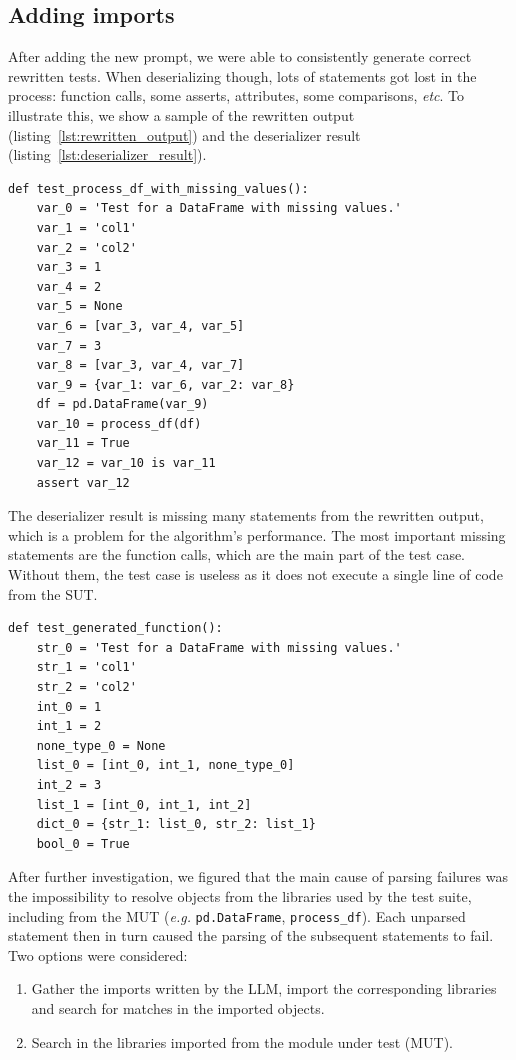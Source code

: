 \documentclass{article}
\newenvironment{code}{\captionsetup{type=listing}}{}
\begin{document}
\subsection{Adding imports}
After adding the new prompt, we were able to consistently generate correct rewritten tests. When deserializing though, lots of statements got lost in the process: function calls, some asserts, attributes, some comparisons, \textit{etc}.
To illustrate this, we show a sample of the rewritten output (listing~\ref{lst:rewritten_output}) and the deserializer result (listing~\ref{lst:deserializer_result}).

\begin{code}
\caption{Rewritten output (sample)}\label{lst:rewritten_output}
\begin{verbatim}
def test_process_df_with_missing_values():
    var_0 = 'Test for a DataFrame with missing values.'
    var_1 = 'col1'
    var_2 = 'col2'
    var_3 = 1
    var_4 = 2
    var_5 = None
    var_6 = [var_3, var_4, var_5]
    var_7 = 3
    var_8 = [var_3, var_4, var_7]
    var_9 = {var_1: var_6, var_2: var_8}
    df = pd.DataFrame(var_9)
    var_10 = process_df(df)
    var_11 = True
    var_12 = var_10 is var_11
    assert var_12
\end{verbatim}
\end{code}

The deserializer result is missing many statements from the rewritten output, which is a problem for the algorithm's performance. The most important missing statements are the function calls, which are the main part of the test case. Without them, the test case is useless as it does not execute a single line of code from the SUT.

\begin{code}
\caption{Deserializer result}\label{lst:deserializer_result}
\begin{verbatim}
def test_generated_function():
    str_0 = 'Test for a DataFrame with missing values.'
    str_1 = 'col1'
    str_2 = 'col2'
    int_0 = 1
    int_1 = 2
    none_type_0 = None
    list_0 = [int_0, int_1, none_type_0]
    int_2 = 3
    list_1 = [int_0, int_1, int_2]
    dict_0 = {str_1: list_0, str_2: list_1}
    bool_0 = True
\end{verbatim}
\end{code}

After further investigation, we figured that the main cause of parsing failures was the impossibility to resolve objects from the libraries used by the test suite, including from the MUT (\textit{e.g.} \texttt{pd.DataFrame}, \texttt{process\_df}). Each unparsed statement then in turn caused the parsing of the subsequent statements to fail.
Two options were considered:
\begin{enumerate}
    \item\label{item:llm_imports} Gather the imports written by the LLM, import the corresponding libraries and search for matches in the imported objects.
    \item\label{item:mut_imports} Search in the libraries imported from the module under test (MUT).
\end{enumerate}
\end{document}
